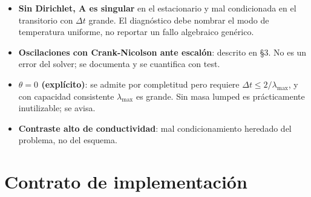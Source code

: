 \documentclass[11pt,letterpaper,oneside]{report}
\begin{document}
\begin{itemize}
  \item \textbf{Sin Dirichlet, $\mathbf A$ es singular} en el estacionario y mal condicionada en el transitorio con $\Delta t$ grande. El diagnóstico debe nombrar el modo de temperatura uniforme, no reportar un fallo algebraico genérico.
  \item \textbf{Oscilaciones con Crank-Nicolson ante escalón}: descrito en §3. No es un error del solver; se documenta y se cuantifica con test.
  \item \textbf{$\theta = 0$ (explícito)}: se admite por completitud pero requiere $\Delta t \le 2/\lambda_{\max}$, y con capacidad consistente $\lambda_{\max}$ es grande. Sin masa lumped es prácticamente inutilizable; se avisa.
  \item \textbf{Contraste alto de conductividad}: mal condicionamiento heredado del problema, no del esquema.
\end{itemize}


\section{Contrato de implementación}
\end{document}
